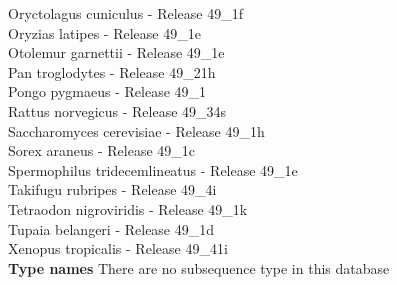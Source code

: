 \documentclass{article}
\begin{document}
\begin{Schunk}
 Oryctolagus cuniculus - Release 49\_1f \\
 Oryzias latipes - Release 49\_1e \\
 Otolemur garnettii - Release 49\_1e \\
 Pan troglodytes - Release 49\_21h \\
 Pongo pygmaeus - Release 49\_1 \\
 Rattus norvegicus - Release 49\_34s \\
 Saccharomyces cerevisiae - Release 49\_1h \\
 Sorex araneus - Release 49\_1c \\
 Spermophilus tridecemlineatus - Release 49\_1e \\
 Takifugu rubripes - Release 49\_4i \\
 Tetraodon nigroviridis - Release 49\_1k \\
 Tupaia belangeri - Release 49\_1d \\
 Xenopus tropicalis - Release 49\_41i \\


\textbf{Type names}
There are no subsequence type in this database

\end{Schunk}
\end{document}

